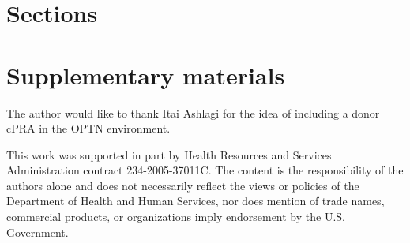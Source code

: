 \documentclass[format=acmsmall, review=false]{acmart}
\begin{document}
\appendix
\section{Sections}

\section{Supplementary materials}

\begin{acks}
	

The author would like to thank Itai Ashlagi for the idea of including a donor cPRA in the OPTN environment.

This work was supported in part by Health Resources and Services Administration contract 234-2005-37011C. The content is the responsibility of the authors alone and does not necessarily reflect the views or policies of the Department of Health and Human Services, nor does mention of trade names, commercial products, or organizations imply endorsement by the U.S. Government.

	
\end{acks}



\end{document}
